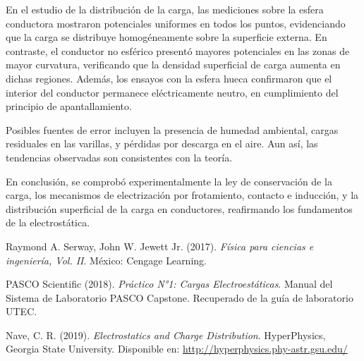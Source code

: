 \documentclass[12pt,a4paper]{article}
\begin{document}
En el estudio de la distribución de la carga, las mediciones sobre la esfera conductora mostraron potenciales uniformes en todos los puntos, evidenciando que la carga se distribuye homogéneamente sobre la superficie externa. En contraste, el conductor no esférico presentó mayores potenciales en las zonas de mayor curvatura, verificando que la densidad superficial de carga aumenta en dichas regiones. Además, los ensayos con la esfera hueca confirmaron que el interior del conductor permanece eléctricamente neutro, en cumplimiento del principio de apantallamiento.

Posibles fuentes de error incluyen la presencia de humedad ambiental, cargas residuales en las varillas, y pérdidas por descarga en el aire. Aun así, las tendencias observadas son consistentes con la teoría.

En conclusión, se comprobó experimentalmente la ley de conservación de la carga, los mecanismos de electrización por frotamiento, contacto e inducción, y la distribución superficial de la carga en conductores, reafirmando los fundamentos de la electrostática.


\begin{thebibliography}{9}

Raymond A. Serway, John W. Jewett Jr. (2017). \textit{Física para ciencias e ingeniería, Vol. II}. México: Cengage Learning.

PASCO Scientific (2018). \textit{Práctico N°1: Cargas Electroestáticas}. Manual del Sistema de Laboratorio PASCO Capstone. Recuperado de la guía de laboratorio UTEC.

Nave, C. R. (2019). \textit{Electrostatics and Charge Distribution}. HyperPhysics, Georgia State University. Disponible en: \url{http://hyperphysics.phy-astr.gsu.edu/}


\end{thebibliography}
\end{document}
